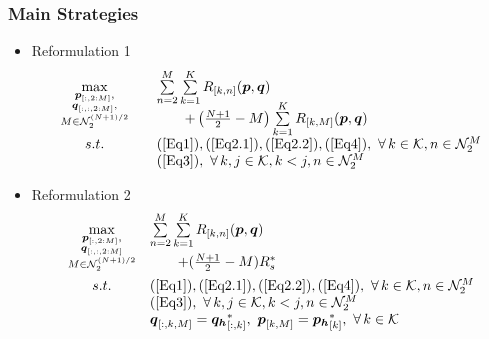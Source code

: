 \documentclass[11.5pt]{beamer}
\begin{document}
\begin{frame}
\frametitle{Main Strategies}
	\begin{itemize}
		\item<1-> Reformulation 1
		\begin{equation}\label{reformulation1}
			\begin{array}{cll}
			\max\limits_{\substack{\boldsymbol{p}_{[:,2:M]}, \\ \boldsymbol{q}_{[:,:,2:M]}, \\ M\in\mathcal{N}_2^{(N+1)/2}}}\quad & \sum\limits_{n=2}^{M}\sum\limits_{k=1}^K R_{[k,n]}(\boldsymbol{p},\boldsymbol{q}) \\[-20pt] &\qquad+\left(\frac{N+1}{2}-M\right)\sum\limits_{k=1}^KR_{[k,M]}(\boldsymbol{p},\boldsymbol{q}) \\
			s.t. \quad & (\ref{Eq1}),(\ref{Eq2.1}),(\ref{Eq2.2}),(\ref{Eq4}),\ \forall\,k\in\mathcal{K},n\in\mathcal{N}_2^M \\
			& (\ref{Eq3}),\ \forall\,k,j\in\mathcal{K},k<j,n\in\mathcal{N}_2^M
			\end{array}
		\end{equation}
		\item<2-> Reformulation 2
		\begin{equation}\label{reformulation2}
			\begin{array}{cl}
			\max\limits_{\substack{\boldsymbol{p}_{[:,2:M]}, \\ \boldsymbol{q}_{[:,:,2:M]} \\ M\in\mathcal{N}_2^{(N+1)/2}
			}} & \sum\limits_{n=2}^{M}\sum\limits_{k=1}^K R_{[k,n]}(\boldsymbol{p},\boldsymbol{q}) \\[-13pt] &\qquad+(\frac{N+1}{2}-M)R_s^* \\[5pt]
			s.t.  & (\ref{Eq1}),(\ref{Eq2.1}),(\ref{Eq2.2}),(\ref{Eq4}),\ \forall\,k\in\mathcal{K},n\in\mathcal{N}_2^M \\
			& (\ref{Eq3}),\ \forall\,k,j\in\mathcal{K},k<j,n\in\mathcal{N}_2^M \\
			& \boldsymbol{q}_{[:,k,M]}=\boldsymbol{q_h}^*_{[:,k]},\   \boldsymbol{p}_{[k,M]} = \boldsymbol{p_h}^*_{[k]},\  \forall\,k\in\mathcal{K}
			\end{array}
		\end{equation}
	\end{itemize}
\end{frame}
\end{document}
